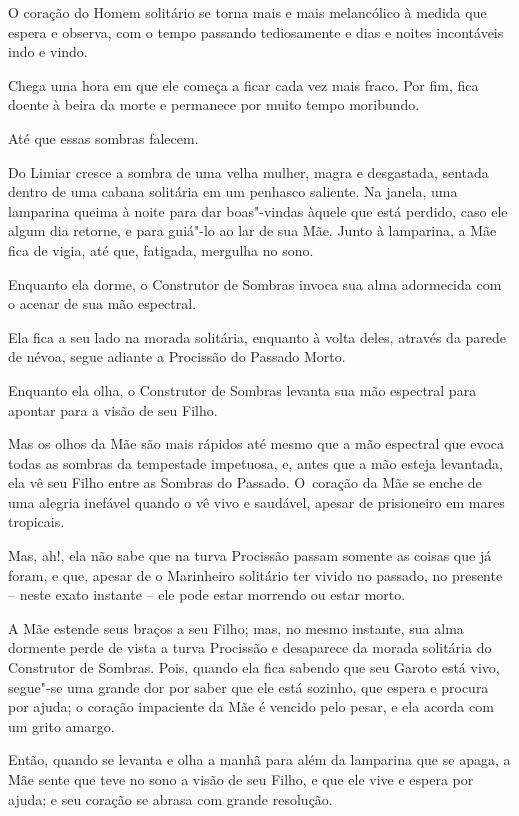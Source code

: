 O coração do Homem solitário se torna mais e mais melancólico à medida que
espera e observa, com o tempo passando tediosamente e dias e noites
incontáveis indo e vindo.

\smallskip
Chega uma hora em que ele começa a ficar cada vez mais fraco. Por fim,
fica doente à beira da morte e permanece por muito tempo moribundo.

Até que essas sombras falecem.

\smallskip
Do Limiar cresce a sombra de uma velha mulher, magra e desgastada,
sentada dentro de uma cabana solitária em um penhasco saliente. Na
janela, uma lamparina queima à noite para dar boas"-vindas àquele que está
perdido, caso ele algum dia retorne, e para guiá"-lo ao lar de sua Mãe.
Junto à lamparina, a Mãe fica de vigia, até que, fatigada, mergulha no
sono.

Enquanto ela dorme, o Construtor de Sombras invoca sua alma adormecida
com o acenar de sua mão espectral.

Ela fica a seu lado na morada solitária, enquanto à volta deles, através
da parede de névoa, segue adiante a Procissão do Passado Morto.

Enquanto ela olha, o Construtor de Sombras levanta sua mão espectral
para apontar para a visão de seu Filho.

Mas os olhos da Mãe são mais rápidos até mesmo que a mão espectral que
evoca todas as sombras da tempestade impetuosa, e, antes que a mão
esteja levantada, ela vê seu Filho entre as Sombras do Passado. O~coração da Mãe se enche de uma alegria inefável quando o vê vivo e
saudável, apesar de prisioneiro em mares tropicais.

Mas, ah!, ela não sabe que na turva Procissão passam somente as coisas
que já foram, e que, apesar de o Marinheiro solitário ter vivido no
passado, no presente -- neste exato instante -- ele pode estar morrendo
ou estar morto.

A Mãe estende seus braços a seu Filho; mas, no mesmo instante, sua alma
dormente perde de vista a turva Procissão e desaparece da morada
solitária do Construtor de Sombras. Pois, quando ela fica sabendo que
seu Garoto está vivo, segue"-se uma grande dor por saber que ele está
sozinho, que espera e procura por ajuda; o coração impaciente da Mãe é
vencido pelo pesar, e ela acorda com um grito amargo.

Então, quando se levanta e olha a manhã para além da lamparina que se
apaga, a Mãe sente que teve no sono a visão de seu Filho, e que ele vive
e espera por ajuda; e seu coração se abrasa com grande resolução.

